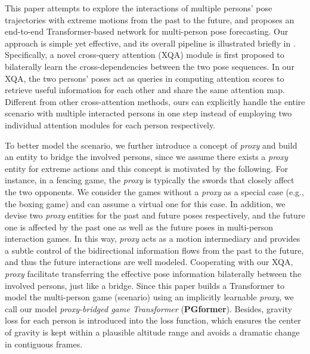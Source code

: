 \documentclass[10pt,twocolumn,letterpaper]{article}
\begin{document}
This paper attempts to explore the interactions of multiple persons' pose trajectories with extreme motions from the past to the future, and proposes an end-to-end Transformer-based network for multi-person pose forecasting. 
Our approach is simple yet effective, and its overall pipeline is illustrated briefly in . 
Specifically, a novel cross-query attention (XQA) module is first proposed to bilaterally learn the cross-dependencies between the two pose sequences. 
In our XQA, the two persons' poses act as queries in computing attention scores to retrieve useful information for each other and share the same attention map.  
Different from other cross-attention methods, ours can explicitly handle the entire scenario with multiple interacted persons in one step instead of employing two individual attention modules for each person respectively. 

To better model the scenario, we further introduce a concept of \textit{proxy} and build an entity to bridge the involved persons, since we assume there exists a \textit{proxy} entity for extreme actions and this concept is motivated by the following. 
For instance, in a fencing game, the \textit{proxy} is typically the swords that closely affect the two opponents. 
We consider the games without a \textit{proxy} as a special case (e.g., the boxing game) and can assume a virtual one for this case.
In addition, we devise two \textit{proxy} entities for the past and future poses respectively, and the future one is affected by the past one as well as the future poses in multi-person interaction games. 
In this way, \textit{proxy} acts as a motion intermediary and provides a subtle control of the bidirectional information flows from the past to the future, and thus the future interactions are well modeled.
Cooperating with our XQA, \textit{proxy} facilitate transferring the effective pose information bilaterally between the involved persons, just like a bridge. 
Since this paper builds a Transformer to model the multi-person game (scenario) using an implicitly learnable \textit{proxy}, we call our model \textit{proxy-bridged game Transformer} (\textbf{PGformer}). 
Besides, gravity loss for each person is introduced into the loss function, which ensures the center of gravity is kept within a plausible altitude range and avoids a dramatic change in contiguous frames. 
\end{document}
